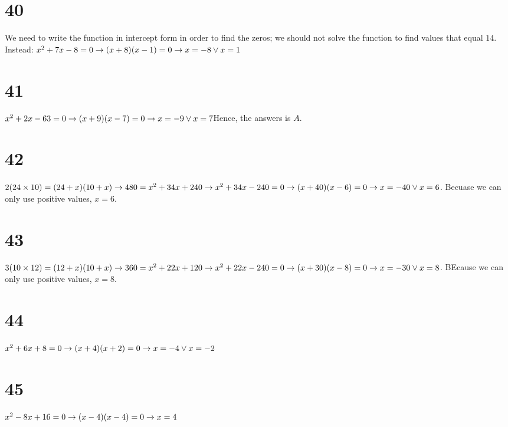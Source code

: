 \documentclass{article}
\theoremstyle{definition}
\begin{document}
\section*{40}
We need to write the function in intercept form in order to find the zeros; we should not solve the function to find values that equal $14$. Instead:\newline
$x^2+7x-8=0\newline\rightarrow (x+8)(x-1)=0\newline\rightarrow x=-8\vee x=1$

\section*{41}
$x^2+2x-63=0\newline\rightarrow (x+9)(x-7)=0\newline\rightarrow x=-9\vee x=7$\newline Hence, the answers is $A$.

\section*{42}
$2(24\times 10)=(24+x)(10+x)\newline\rightarrow 480=x^2+34x+240\newline\rightarrow x^2+34x-240=0\newline\rightarrow (x+40)(x-6)=0\newline\rightarrow 
x=-40\vee x=6$. Becuase we can only use positive values, $x=6$.

\section*{43}
$3(10\times 12)=(12+x)(10+x)\newline\rightarrow 360=x^2+22x+120\newline\rightarrow x^2+22x-240=0\newline\rightarrow (x+30)(x-8)=0\newline\rightarrow 
x=-30\vee x=8$. BEcause we can only use positive values, $x=8$.

\section*{44}
$x^2+6x+8=0\newline\rightarrow (x+4)(x+2)=0\newline\rightarrow x=-4\vee x=-2$

\section*{45}
$x^2-8x+16=0\newline\rightarrow (x-4)(x-4)=0\newline\rightarrow x=4$
\end{document}
